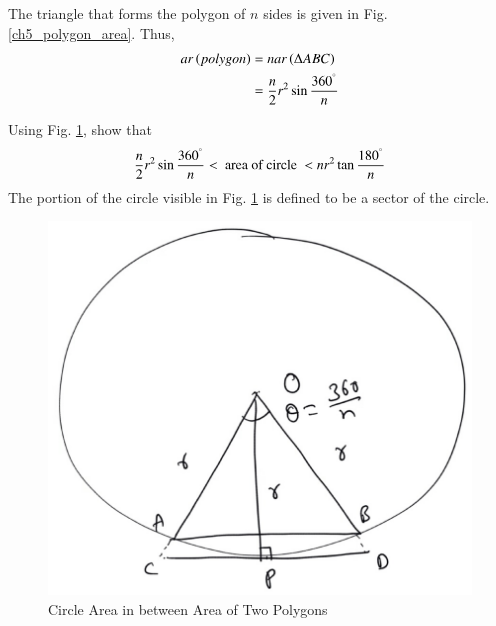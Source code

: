 \proof The triangle that forms the polygon of $n$ sides is given in Fig. \ref{ch5_polygon_area}.  Thus,
%
\begin{equation}
\begin{split}
ar\left(polygon\right) &= n ar\left(\Delta ABC\right) \\
&= \frac{n}{2}r^{2}\sin\frac{360^{\degree}}{n}
\end{split}
\end{equation}
%
\begin{problem}
	Using Fig. \ref{ch5_circle_squeeze}, show that
%
\begin{equation}
\label{ch5_circle_squeeze_eq}
\frac{n}{2}r^{2}\sin\frac{360^{\degree}}{n} < \text{ area of circle } < nr^{2}\tan\frac{180^{\degree}}{n}
\end{equation}
%
The portion of the circle visible in Fig. \ref{ch5_circle_squeeze} is defined to be a sector of the circle.
\end{problem}
\begin{figure}[!h]
	\begin{center}
		
		\includegraphics[width=\columnwidth]{./figs/ch5_circle_squeeze}
		\vspace*{-10cm}
	\end{center}
	\caption{Circle Area in between Area of Two Polygons}
	\label{ch5_circle_squeeze}	
\end{figure}
%

